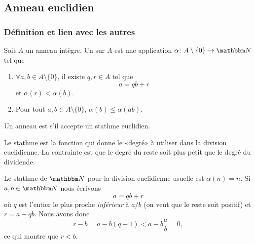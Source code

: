 \subsection{Anneau euclidien}

\subsubsection{Définition et lien avec les autres}

\begin{definition} \label{DefAXitWRL}
    Soit \( A\) un anneau intègre. Un  sur \( A\) est une application \( \alpha\colon A\setminus\{ 0 \}\to \eN\) tel que
    \begin{enumerate}
        \item       \label{ITEMooLVJAooLpjgEz}
            \( \forall a,b\in A\setminus\{ 0 \}\), il existe \( q,r\in A\) tel que
            \begin{equation}
                a=qb+r
            \end{equation}
            et \( \alpha(r)<\alpha(b)\).
        \item
            Pour tout \( a,b\in A\setminus\{ 0 \}\), \( \alpha(b)\leq \alpha(ab)\).
    \end{enumerate}
    Un anneau est  s'il accepte un stathme euclidien.
\end{definition}
Le stathme est la fonction qui donne le «degré» à utiliser dans la division euclidienne. La contrainte est que le degré du reste soit plus petit que le degré du dividende.

\begin{example} \label{ExwqlCwvV}
    Le stathme de \( \eN\) pour la division euclidienne usuelle est \( \alpha(n)=n\). Si \( a,b\in \eN\) nous écrivons
    \begin{equation}
        a=qb+r
    \end{equation}
    où \( q\) est l'entier le plus proche \emph{inférieur} à \( a/b\) (on veut que le reste soit positif) et \( r=a-qb\). Nous avons donc
    \begin{equation}
        r-b=a-b(q+1)<a-b\frac{ a }{ b }=0,
    \end{equation}
    ce qui montre que \( r<b\).
\end{example}

